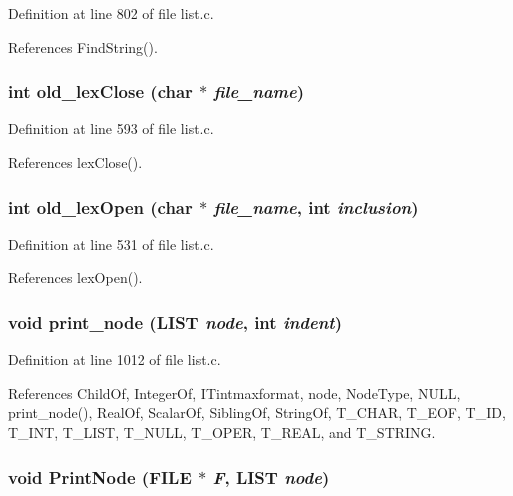 Definition at line 802 of file list.c.

References Find\-String().
\subsubsection{\setlength{\rightskip}{0pt plus 5cm}int old\_\-lex\-Close (char $\ast$ {\em file\_\-name})}\label{list_8h_1221695f0862f44e98c6ba5c5e6bb749}




Definition at line 593 of file list.c.

References lex\-Close().
\subsubsection{\setlength{\rightskip}{0pt plus 5cm}int old\_\-lex\-Open (char $\ast$ {\em file\_\-name}, int {\em inclusion})}\label{list_8h_d316fdb7af85c1d1a1d01c7b1fa548f7}




Definition at line 531 of file list.c.

References lex\-Open().
\subsubsection{\setlength{\rightskip}{0pt plus 5cm}void print\_\-node (\bf{LIST} {\em node}, int {\em indent})}\label{list_8h_e7f191c0df600c02d7fd68f6da542f1f}




Definition at line 1012 of file list.c.

References Child\-Of, Integer\-Of, ITintmaxformat, node, Node\-Type, NULL, print\_\-node(), Real\-Of, Scalar\-Of, Sibling\-Of, String\-Of, T\_\-CHAR, T\_\-EOF, T\_\-ID, T\_\-INT, T\_\-LIST, T\_\-NULL, T\_\-OPER, T\_\-REAL, and T\_\-STRING.
\subsubsection{\setlength{\rightskip}{0pt plus 5cm}void Print\-Node (FILE $\ast$ {\em F}, \bf{LIST} {\em node})}\label{list_8h_506b579eb7fea8a1580d4ce37aa1386c}





